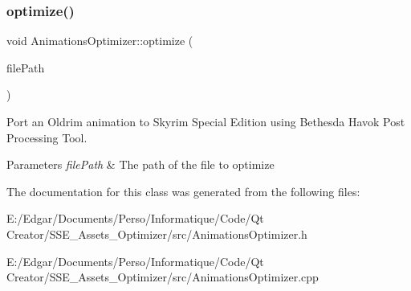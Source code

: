 \subsubsection{\texorpdfstring{optimize()}{optimize()}}
{\footnotesize\ttfamily void Animations\+Optimizer\+::optimize (\begin{DoxyParamCaption}\item[{const Q\+String \&}]{file\+Path }\end{DoxyParamCaption})\hspace{0.3cm}{\ttfamily [static]}}



Port an Oldrim animation to Skyrim Special Edition using Bethesda Havok Post Processing Tool. 


\begin{DoxyParams}{Parameters}
{\em file\+Path} & The path of the file to optimize \\
\hline
\end{DoxyParams}


The documentation for this class was generated from the following files\+:\begin{DoxyCompactItemize}
\item 
E\+:/\+Edgar/\+Documents/\+Perso/\+Informatique/\+Code/\+Qt Creator/\+S\+S\+E\+\_\+\+Assets\+\_\+\+Optimizer/src/Animations\+Optimizer.\+h\item 
E\+:/\+Edgar/\+Documents/\+Perso/\+Informatique/\+Code/\+Qt Creator/\+S\+S\+E\+\_\+\+Assets\+\_\+\+Optimizer/src/Animations\+Optimizer.\+cpp\end{DoxyCompactItemize}
